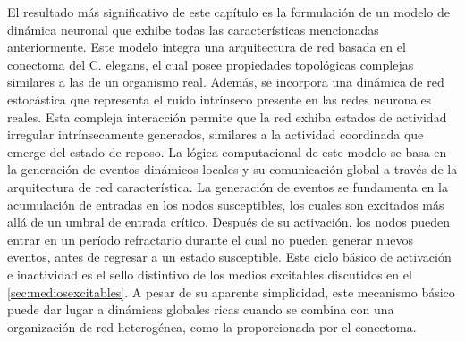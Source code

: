 El resultado más significativo de este capítulo es la formulación de un modelo de dinámica neuronal que exhibe todas las características mencionadas anteriormente. Este modelo integra una arquitectura de red basada en el conectoma del C. elegans, el cual posee propiedades topológicas complejas similares a las de un organismo real. Además, se incorpora una dinámica de red estocástica que representa el ruido intrínseco presente en las redes neuronales reales. Esta compleja interacción permite que la red exhiba estados de actividad irregular intrínsecamente generados, similares a la actividad coordinada que emerge del estado de reposo. La lógica computacional de este modelo se basa en la generación de eventos dinámicos locales y su comunicación global a través de la arquitectura de red característica. La generación de eventos se fundamenta en la acumulación de entradas en los nodos susceptibles, los cuales son excitados más allá de un umbral de entrada crítico. Después de su activación, los nodos pueden entrar en un período refractario durante el cual no pueden generar nuevos eventos, antes de regresar a un estado susceptible. Este ciclo básico de activación e inactividad es el sello distintivo de los medios excitables discutidos en el \cref{sec:mediosexcitables}. A pesar de su aparente simplicidad, este mecanismo básico puede dar lugar a dinámicas globales ricas cuando se combina con una organización de red heterogénea, como la proporcionada por el conectoma.

